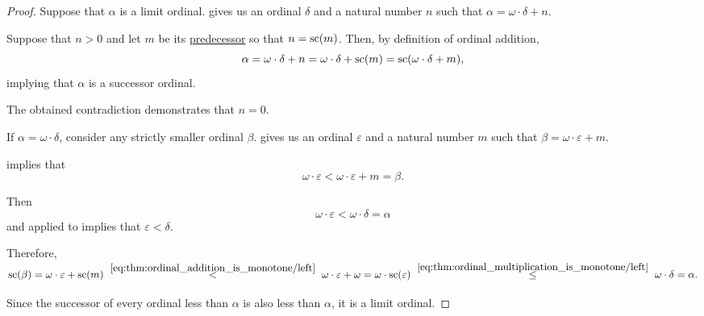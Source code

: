 \begin{proof}
  \SufficiencySubProof Suppose that \( \alpha \) is a limit ordinal.  gives us an ordinal \( \delta \) and a natural number \( n \) such that \( \alpha = \omega \cdot \delta + n \).

  Suppose that \( n > 0 \) and let \( m \) be its \hyperref[thm:nonzero_natural_numbers_have_predecessors]{predecessor} so that \( n = \op{sc}(m) \). Then, by definition of ordinal addition,
  \begin{equation*}
    \alpha
    =
    \omega \cdot \delta + n
    =
    \omega \cdot \delta + \op{sc}(m)
    =
    \op{sc}(\omega \cdot \delta + m),
  \end{equation*}
  implying that \( \alpha \) is a successor ordinal.

  The obtained contradiction demonstrates that \( n = 0 \).

  \NecessitySubProof If \( \alpha = \omega \cdot \delta \), consider any strictly smaller ordinal \( \beta \).  gives us an ordinal \( \varepsilon \) and a natural number \( m \) such that \( \beta = \omega \cdot \varepsilon + m \).

   implies that
  \begin{equation*}
    \omega \cdot \varepsilon < \omega \cdot \varepsilon + m = \beta.
  \end{equation*}

  Then
  \begin{equation*}
    \omega \cdot \varepsilon < \omega \cdot \delta = \alpha
  \end{equation*}
  and  applied to  implies that \( \varepsilon < \delta \).

  Therefore,
  \begin{equation*}
    \op{sc}(\beta)
    =
    \omega \cdot \varepsilon + \op{sc}(m)
    \reloset {\eqref{eq:thm:ordinal_addition_is_monotone/left}} <
    \omega \cdot \varepsilon + \omega
    =
    \omega \cdot \op{sc}(\varepsilon)
    \reloset {\eqref{eq:thm:ordinal_multiplication_is_monotone/left}} \leq
    \omega \cdot \delta
    =
    \alpha.
  \end{equation*}

  Since the successor of every ordinal less than \( \alpha \) is also less than \( \alpha \), it is a limit ordinal.
\end{proof}

